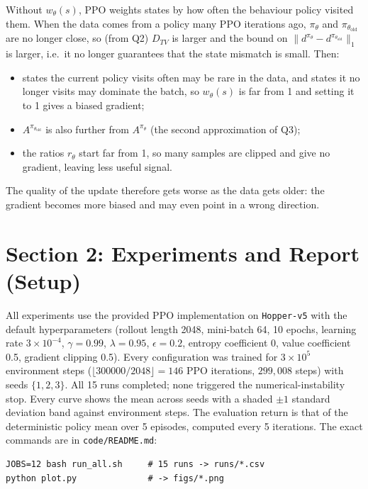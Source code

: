 \documentclass[11pt]{article}
\newcommand{\piold}{\pi_{\theta_{\mathrm{old}}}}
\newcommand{\code}[1]{\texttt{#1}}
\begin{document}
\begin{enumerate}[label=(\alph*)]
        Without $w_\theta(s)$, PPO weights states by how often the behaviour policy visited them. When
        the data comes from a policy many PPO iterations ago, $\pi_\theta$ and $\piold$ are no longer
        close, so (from Q2) $D_{TV}$ is larger and the bound on $\|d^{\pi_\theta} - d^{\piold}\|_1$
        is larger, i.e.\ it no longer guarantees that the state mismatch is small. Then:
        \begin{itemize}
          \item states the current policy visits often may be rare in the data, and states it no longer
                visits may dominate the batch, so $w_\theta(s)$ is far from 1 and setting it to 1 gives
                a biased gradient;
          \item $A^{\piold}$ is also further from $A^{\pi_\theta}$ (the second approximation of Q3);
          \item the ratios $r_\theta$ start far from 1, so many samples are clipped and give no
                gradient, leaving less useful signal.
        \end{itemize}
        The quality of the update therefore gets worse as the data gets older: the gradient becomes
        more biased and may even point in a wrong direction.
\end{enumerate}

\section*{Section 2: Experiments and Report (Setup)}
All experiments use the provided PPO implementation on \code{Hopper-v5} with the default
hyperparameters (rollout length 2048, mini-batch 64, 10 epochs, learning rate $3\times10^{-4}$,
$\gamma=0.99$, $\lambda=0.95$, $\epsilon=0.2$, entropy coefficient 0, value coefficient 0.5,
gradient clipping 0.5). Every configuration was trained for $3\times10^5$ environment steps
($\lfloor 300000/2048\rfloor = 146$ PPO iterations, $299{,}008$ steps) with seeds $\{1,2,3\}$.
All 15 runs completed; none triggered the numerical-instability stop. Every curve shows the mean
across seeds with a shaded $\pm 1$ standard deviation band against environment steps. The evaluation
return is that of the deterministic policy mean over 5 episodes, computed every 5 iterations. The exact
commands are in \code{code/README.md}:
\begin{verbatim}
JOBS=12 bash run_all.sh     # 15 runs -> runs/*.csv
python plot.py              # -> figs/*.png
\end{verbatim}
\end{document}
